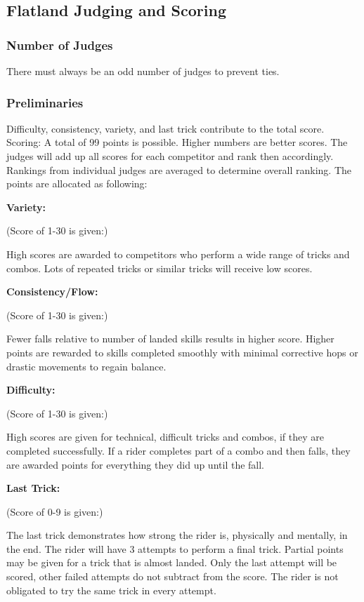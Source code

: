 \subsection{Flatland Judging and Scoring \label{sec:flat-street_flatland-judging-scoring}}

\subsubsection{Number of Judges}
There must always be an odd number of judges to prevent ties. 

\subsubsection{Preliminaries}
Difficulty, consistency, variety, and last trick contribute to the total score.
Scoring: A total of 99 points is possible.
Higher numbers are better scores.
The judges will add up all scores for each competitor and rank then accordingly.
Rankings from individual judges are averaged to determine overall ranking.
The points are allocated as following: 

\textbf{Variety:}

(Score of 1-30 is given:)

High scores are awarded to competitors who perform a wide range of tricks and combos.
Lots of repeated tricks or similar tricks will receive low scores.

\textbf{Consistency/Flow:}

(Score of 1-30 is given:)

Fewer falls relative to number of landed skills results in higher score.
Higher points are rewarded to skills completed smoothly with minimal corrective hops or drastic movements to regain balance.

\textbf{Difficulty:}

(Score of 1-30 is given:)

High scores are given for technical, difficult tricks and combos, if they are completed successfully.
If a rider completes part of a combo and then falls, they are awarded points for everything they did up until the fall. 

\textbf{Last Trick:}

(Score of 0-9 is given:)

The last trick demonstrates how strong the rider is, physically and mentally, in the end.
The rider will have 3 attempts to perform a final trick.
Partial points may be given for a trick that is almost landed.
Only the last attempt will be scored, other failed attempts do not subtract from the score.
The rider is not obligated to try the same trick in every attempt.

